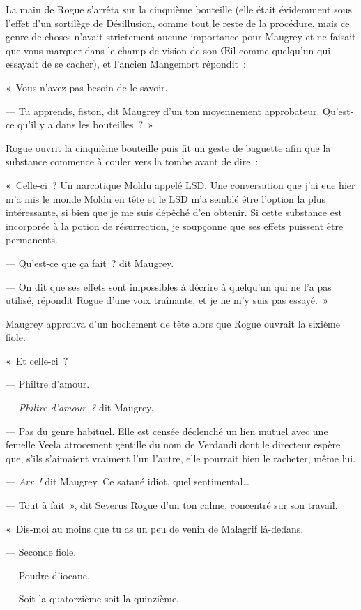 La main de Rogue s'arrêta sur la cinquième bouteille (elle était évidemment sous l'effet d'un sortilège de Désillusion, comme tout le reste de la procédure, mais ce genre de choses n'avait strictement aucune importance pour Maugrey et ne faisait que vous marquer dans le champ de vision de son Œil comme quelqu'un qui essayait de se cacher), et l'ancien Mangemort répondit~:

«~Vous n'avez pas besoin de le savoir.

--- Tu apprends, fiston, dit Maugrey d'un ton moyennement approbateur. Qu'est-ce qu'il y a dans les bouteilles~?~»

Rogue ouvrit la cinquième bouteille puis fit un geste de baguette afin que la substance commence à couler vers la tombe avant de dire~:

«~Celle-ci~? Un narcotique Moldu appelé LSD. Une conversation que j'ai eue hier m'a mis le monde Moldu en tête et le LSD m'a semblé être l'option la plus intéressante, si bien que je me suis dépêché d'en obtenir. Si cette substance est incorporée à la potion de résurrection, je soupçonne que ses effets puissent être permanents.

--- Qu'est-ce que ça fait~? dit Maugrey.

--- On dit que ses effets sont impossibles à décrire à quelqu'un qui ne l'a pas utilisé, répondit Rogue d'une voix traînante, et je ne m'y suis pas essayé.~»

Maugrey approuva d'un hochement de tête alors que Rogue ouvrait la sixième fiole.

«~Et celle-ci~?

--- Philtre d'amour.

--- \emph{Philtre d'amour~?} dit Maugrey.

--- Pas du genre habituel. Elle est censée déclenché un lien mutuel avec une femelle Veela atrocement gentille du nom de Verdandi dont le directeur espère que, s'ils s'aimaient vraiment l'un l'autre, elle pourrait bien le racheter, même lui.

--- \emph{Arr~!}  dit Maugrey. Ce satané idiot, quel sentimental…

--- Tout à fait~», dit Severus Rogue d'un ton calme, concentré sur son travail.

«~Dis-moi au moins que tu as un peu de venin de Malagrif là-dedans.

--- Seconde fiole.

--- Poudre d'iocane.

--- Soit la quatorzième soit la quinzième.

